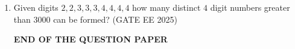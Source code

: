 \documentclass[journal]{IEEEtran}
\begin{document}
\begin{enumerate}[start=26]
\item Given digits $2, 2, 3, 3, 3, 4, 4, 4, 4$ how many distinct $4$ digit numbers greater than $3000$ can be formed?
\hfill{(GATE EE 2025)}
\begin{enumerate}
\end{enumerate}

\vspace{2cm}
\textbf{END OF THE QUESTION PAPER}
\end{enumerate}
\end{document}
